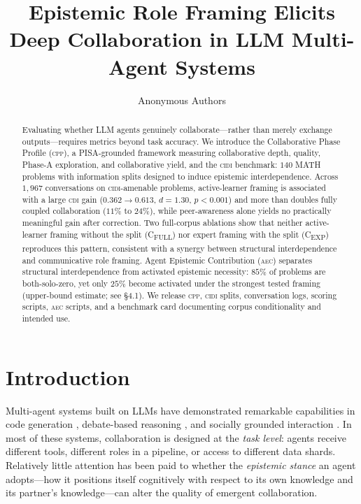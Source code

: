 \documentclass{article}
\title{Epistemic Role Framing Elicits Deep Collaboration in LLM Multi-Agent Systems}
\author{Anonymous Authors}
\newcommand{\CDI}{\textsc{cdi}}
\newcommand{\CPP}{\textsc{cpp}}
\newcommand{\CIDI}{\textsc{cidi}}
\newcommand{\AEC}{\textsc{aec}}
\begin{document}
\maketitle

\begin{abstract}
Evaluating whether LLM agents genuinely collaborate---rather than merely
exchange outputs---requires metrics beyond task accuracy. We introduce the
Collaborative Phase Profile (\CPP), a PISA-grounded framework measuring
collaborative depth, quality, Phase-A exploration, and collaborative yield,
and the \CIDI{} benchmark: $140$ MATH problems with information splits
designed to induce epistemic interdependence. Across $1{,}967$ conversations on \CIDI-amenable problems,
active-learner framing is associated with a large \CDI{} gain ($0.362 \to 0.613$,
$d=1.30$, $p<0.001$) and more than doubles fully coupled collaboration ($11\%$ to $24\%$),
while peer-awareness alone yields no practically meaningful gain after correction.
Two full-corpus ablations show that neither active-learner framing without the
split (C\textsubscript{FULL}) nor expert framing with the split (C\textsubscript{EXP})
reproduces this pattern, consistent with a synergy between structural interdependence
and communicative role framing. Agent Epistemic Contribution (\AEC) separates
structural interdependence from activated epistemic necessity: $85\%$ of problems
are both-solo-zero, yet only $25\%$ become activated under the strongest tested
framing (upper-bound estimate; see \S4.1). We release \CPP, \CIDI{} splits, conversation logs, scoring scripts,
\AEC{} scripts, and a benchmark card documenting corpus conditionality and intended use.
\end{abstract}

\section{Introduction}
\label{sec:intro}

Multi-agent systems built on LLMs have demonstrated remarkable
capabilities in code generation \citep{hong2023metagpt},
debate-based reasoning \citep{liang2023encouraging, du2023improving},
and socially grounded interaction \citep{park2023generative}. In most of these systems,
collaboration is designed at the \emph{task level}: agents receive
different tools, different roles in a pipeline, or access to different
data shards. Relatively little attention has been paid to whether the
\emph{epistemic stance} an agent adopts---how it positions itself
cognitively with respect to its own knowledge and its partner's
knowledge---can alter the quality of emergent collaboration.
\end{document}
